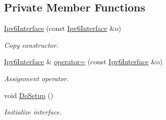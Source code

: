 \subsection*{Private Member Functions}
\begin{DoxyCompactItemize}
\item 
\hyperlink{classns3_1_1Ipv6Interface_ad7906bd708b99055bb0c9afd465d947d}{Ipv6\+Interface} (const \hyperlink{classns3_1_1Ipv6Interface}{Ipv6\+Interface} \&o)
\begin{DoxyCompactList}\small\item\em Copy constructor. \end{DoxyCompactList}\item 
\hyperlink{classns3_1_1Ipv6Interface}{Ipv6\+Interface} \& \hyperlink{classns3_1_1Ipv6Interface_aac2700acd6d3f68072c3df64a09150d3}{operator=} (const \hyperlink{classns3_1_1Ipv6Interface}{Ipv6\+Interface} \&o)
\begin{DoxyCompactList}\small\item\em Assignment operator. \end{DoxyCompactList}\item 
void \hyperlink{classns3_1_1Ipv6Interface_a394066472c703fcf39d17f1bfcc9191e}{Do\+Setup} ()
\begin{DoxyCompactList}\small\item\em Initialize interface. \end{DoxyCompactList}\end{DoxyCompactItemize}
